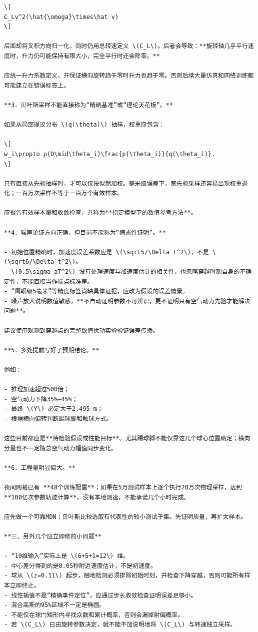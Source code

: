 \documentclass[UTF8,10pt]{ctexart}
\begin{document}
\begin{Verbatim}[breaklines=true,breakanywhere=true,fontsize=\scriptsize,frame=single,framesep=2pt]
\[
C_Lv^2(\hat{\omega}\times\hat v)
\]

后面却将叉积方向归一化，同时仍用总转速定义 \(C_L\)。后者会导致：**旋转轴几乎平行速度时，升力仍可能保持有限大小，完全平行时还会除零。**

应统一升力系数定义，并保证横向旋转趋于零时升力也趋于零。否则后续大量仿真和网络训练都可能建立在错误标签上。

**3．贝叶斯采样不能直接称为“精确基准”或“理论天花板”。**

如果从局部提议分布 \(q(\theta)\) 抽样，权重应包含：

\[
w_i\propto p(D\mid\theta_i)\frac{p(\theta_i)}{q(\theta_i)}.
\]

只有直接从先验抽样时，才可以仅按似然加权。毫米级误差下，宽先验采样还容易出现权重退化；一百万次采样不等于一百万个有效样本。

应报告有效样本量和收敛检查，并称为**指定模型下的数值参考方法**。

**4．噪声论证方向正确，但目前不能称为“病态性证明”。**

- 初始位置精确时，加速度误差系数应是 \(\sqrt5/\Delta t^2\)，不是 \(\sqrt6/\Delta t^2\)。
- \(0.5\sigma_aT^2\) 没有处理速度与加速度估计的相关性，也忽略穿越时刻自身的不确定性，不能直接当作端点标准差。
- “鹰眼级5毫米”等精度标签尚缺具体证据，应改为假设的误差情景。
- 噪声放大说明数值敏感，**不自动证明参数不可辨识，更不证明只有空气动力先验才能解决问题**。

建议使用观测到穿越点的完整数值扰动实验验证误差传播。

**5．多处提前写好了预期结论。**

例如：

- 推理加速超过500倍；
- 空气动力下降35%—45%；
- 最终 \(Y\) 必定大于2.495 m；
- 根据横向偏转判断踢球脚和触球方式。

这些目前都应是**待检验假设或性能目标**。尤其踢球脚不能仅靠这几个球心位置确定；横向分量也不一定随总空气动力幅值同步变化。

**6．工程量明显偏大。**

夜间网格已有 **48个训练配置**；如果在5万测试样本上逐个执行20万次物理采样，达到 **100亿次参数轨迹计算**。没有本地测速，不能承诺几个小时完成。

应先做一个可靠MDN；贝叶斯比较选取有代表性的较小测试子集。先证明质量，再扩大样本。

**三、另外几个应立即修的小问题**

- “10维输入”实际上是 \(6+5+1=12\) 维。
- 中心差分得到的是0.05秒附近速度估计，不是初速度。
- 球从 \(z=0.11\) 起步，触地检测必须排除初始时刻，并检查下降穿越，否则可能所有样本立即终止。
- 线性插值不是“精确事件定位”，应通过步长收敛检查证明误差足够小。
- 混合高斯的95%区域不一定是椭圆。
- 不能仅在球门矩形内寻找众数和累计概率，否则会漏掉射偏概率。
- 若 \(C_L\) 已由旋转参数决定，就不能不加说明地将 \(C_L\) 与转速独立采样。


\end{Verbatim}
\end{document}
